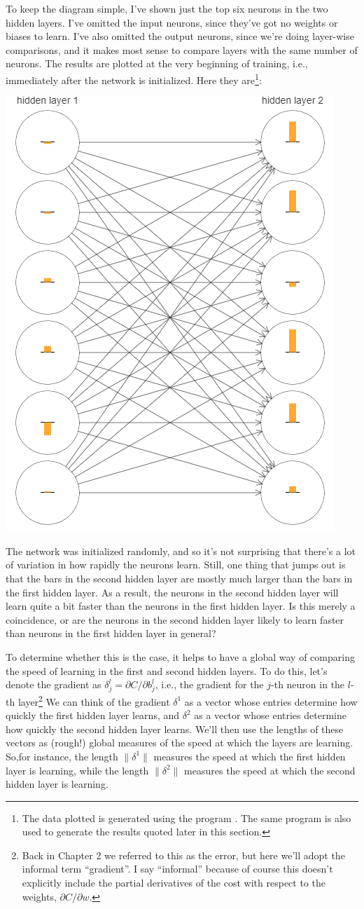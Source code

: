 \documentclass[a4paper,twoside,10pt]{book}
\begin{document}
To keep the diagram simple, I've shown just the top six neurons in the two hidden layers. I've omitted the input neurons, since they've got no weights or biases to learn. I've also omitted the output neurons, since we're doing layer-wise comparisons, and it makes most sense to compare layers with the same number of neurons. The results are plotted at the very beginning of training, i.e., immediately after the network is initialized. Here they are\footnote{The data plotted is generated using the program . The same program is also used to generate the results quoted later in this section.}:
\begin{center}
	\includegraphics[width=0.45\linewidth]{figures/ch5/tikz500}
\end{center}
The network was initialized randomly, and so it's not surprising that there's a lot of variation in how rapidly the neurons learn. Still, one thing that jumps out is that the bars in the second hidden layer are mostly much larger than the bars in the first hidden layer. As a result, the neurons in the second hidden layer will learn quite a bit faster than the neurons in the first hidden layer. Is this merely a coincidence, or are the neurons in the second hidden layer likely to learn faster than neurons in the first hidden layer in general?

To determine whether this is the case, it helps to have a global way of comparing the speed of learning in the first and second hidden layers. To do this, let's denote the gradient as $\delta^l_j=\partial C/\partial b^l_j$, i.e., the gradient for the $j$-th neuron in the $l$-th layer\footnote{Back in Chapter 2 we referred to this as the error, but here we'll adopt the informal term ``gradient''. I say ``informal'' because of course this doesn't explicitly include the partial derivatives of the cost with respect to the weights, $\partial C/\partial w$.}  We can think of the gradient $\delta^1$ as a vector whose entries determine how quickly the first hidden layer learns, and $\delta^2$ as a vector whose entries determine how quickly the second hidden layer learns. We'll then use the lengths of these vectors as (rough!) global measures of the speed at which the layers are learning. So,for instance, the length $\|\delta^1\|$ measures the speed at which the first hidden layer is learning, while the length $\|\delta^2\|$ measures the speed at which the second hidden layer is learning.
\end{document}
